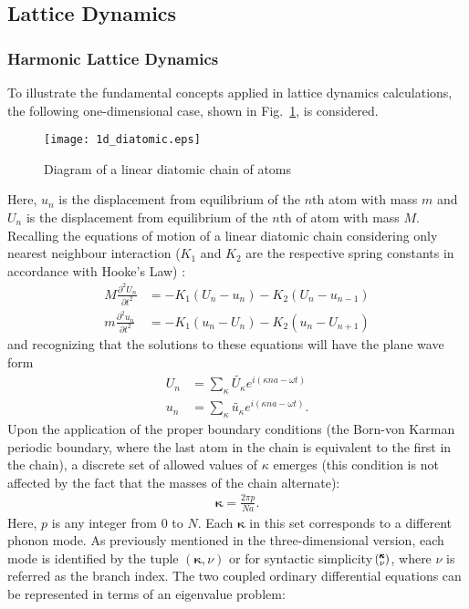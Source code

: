 \subsection{Lattice Dynamics}
\subsubsection{Harmonic Lattice Dynamics}\label{SEC:HLD}
To illustrate the fundamental concepts applied in lattice dynamics calculations, the following one-dimensional case, shown in Fig.~\ref{FIG:diatomic}, is considered. 
\begin{figure}[h!]
\centering
\texttt{[image: 1d\_diatomic.eps]}
\caption{Diagram of a linear diatomic chain of atoms}
\label{FIG:diatomic}
\end{figure}
Here, $u_n$ is the displacement from equilibrium of the $n$th atom with mass $m$ and $U_n$ is the displacement from equilibrium of the $n$th of atom with mass $M$. Recalling the equations of motion of a linear diatomic chain considering only nearest neighbour interaction ($K_1$ and $K_2$ are the respective spring constants in accordance with Hooke's Law) \cite{dove_introduction_1993-3}:
%
\begin{align}
	M\frac{\partial ^2 U_n}{\partial t^2}&=-K_1(U_n-u_n)-K_2(U_n-u_{n-1})\\
	m\frac{\partial ^2 u_n}{\partial t^2}&=-K_1(u_n-U_n)-K_2(u_n-U_{n+1})
\end{align}
%
and recognizing that the solutions to these equations will have the plane wave form
%
\begin{align}
	U_n&=\sum_\kappa \tilde{U_\kappa}e^{i(\kappa na-\omega t)}\\
	u_n&=\sum_\kappa \tilde{u_\kappa}e^{i(\kappa na-\omega t)}.
\end{align}
%
Upon the application of the proper boundary conditions (the Born-von Karman periodic boundary, where the last atom in the chain is equivalent to the first in the chain), a discrete set of allowed values of $\kappa$ emerges (this condition is not affected by the fact that the masses of the chain alternate):
%
\begin{align}
	\pmb{\kappa}=\frac{2\pi p}{Na}.
\end{align}
%
Here, $p$ is any integer from $0$ to $N$. Each $\pmb{\kappa}$ in this set corresponds to a different phonon mode. As previously mentioned in the three-dimensional version, each mode is identified by the tuple $(\pmb{\kappa},\nu)$ or for syntactic simplicity $\mspace{-4.0mu}\left(\mspace{-8.0mu} \begin{smallmatrix}&\pmb{\kappa} \\&\nu\end{smallmatrix} \mspace{-3.0mu}\right)$, where $\nu$ is referred as the branch index.  The two coupled ordinary differential equations can be represented in terms of an eigenvalue problem:
